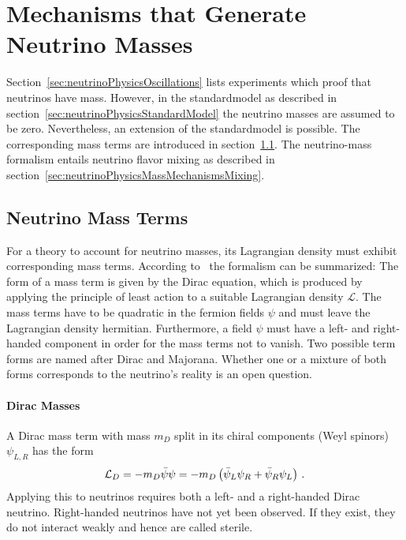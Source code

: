 \section{Mechanisms that Generate Neutrino Masses}
\label{sec:neutrinoPhysicsMassMechanisms}
Section~\ref{sec:neutrinoPhysicsOscillations} lists experiments which proof that neutrinos have mass. However, in the \gls{standardmodel} as described in section~\ref{sec:neutrinoPhysicsStandardModel} the neutrino masses are assumed to be zero. Nevertheless, an extension of the \gls{standardmodel} is possible. The corresponding mass terms are introduced in section~\ref{sec:neutrinoPhysicsMassMechanismsTerms}. The neutrino-mass formalism entails neutrino flavor mixing as described in section~\ref{sec:neutrinoPhysicsMassMechanismsMixing}.

\subsection{Neutrino Mass Terms}
\label{sec:neutrinoPhysicsMassMechanismsTerms}
For a theory to account for neutrino masses, its Lagrangian density must exhibit corresponding mass terms. According to~\cite{zuber2011neutrino} the formalism can be summarized: The form of a mass term is given by the Dirac equation, which is produced by applying the principle of least action to a suitable Lagrangian density $\mathcal{L}$. The mass terms have to be quadratic in the fermion fields $\psi$ and must leave the Lagrangian density hermitian. Furthermore, a field $\psi$ must have a left- and right-handed component in order for the mass terms not to vanish. Two possible term forms are named after Dirac and Majorana. Whether one or a mixture of both forms corresponds to the neutrino's reality is an open question.

\paragraph{Dirac Masses}
A Dirac mass term with mass $m_D$ split in its chiral components (Weyl spinors) $\psi_{L,R}$ has the form~\cite{zuber2011neutrino}
\begin{equation}
\mathcal{L}_D =  -m_D \bar\psi\psi = -m_D \left(\bar\psi_L\psi_R + \bar\psi_R\psi_L \right) \text{\,.}
\end{equation}
Applying this to neutrinos requires both a left- and a right-handed Dirac neutrino. Right-handed neutrinos have not yet been observed. If they exist, they do not interact weakly and hence are called sterile.

